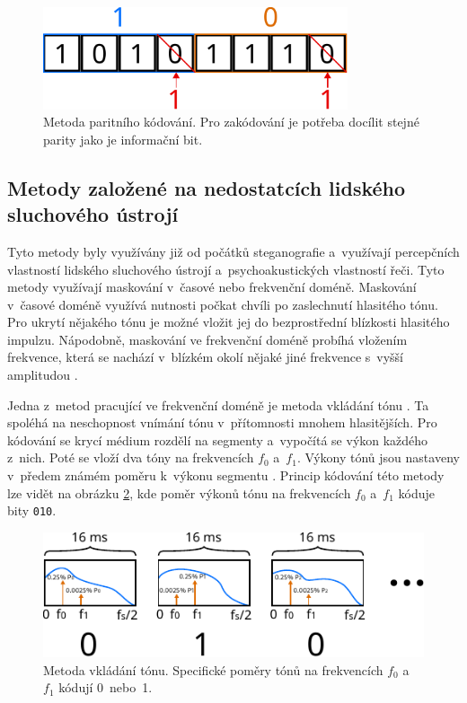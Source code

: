 \begin{figure}[hbt]
    \centering
    \includegraphics[width=0.8\textwidth]{obrazky/parity-coding.pdf}
    \caption{Metoda paritního kódování. Pro zakódování je potřeba docílit
    stejné parity jako je informační bit.}
    \label{pic:parity-coding}
\end{figure}

\subsection*{Metody založené na nedostatcích lidského sluchového ústrojí}
\label{sub:has}

Tyto metody byly využívány již od počátků steganografie a~využívají percepčních
vlastností lidského sluchového ústrojí a~psychoakustických vlastností řeči.
Tyto metody využívají maskování v~časové nebo frekvenční doméně. Maskování
v~časové doméně využívá nutnosti počkat chvíli po zaslechnutí hlasitého tónu.
Pro ukrytí nějakého tónu je možné vložit jej do bezprostřední blízkosti
hlasitého impulzu. Nápodobně, maskování ve frekvenční doméně probíhá vložením
frekvence, která se nachází v~blízkém okolí nějaké jiné frekvence s~vyšší
amplitudou \cite{Dutta2020}.

Jedna z~metod pracující ve frekvenční doméně je metoda vkládání tónu
\cite{Dutta2020}. Ta spoléhá na neschopnost vnímání tónu v~přítomnosti mnohem
hlasitějších. Pro kódování se krycí médium rozdělí na segmenty a~vypočítá se
výkon každého z~nich. Poté se vloží dva tóny na frekvencích $f_0$ a~$f_1$.
Výkony tónů jsou nastaveny v~předem známém poměru k~výkonu segmentu
\cite{Djebbar2012}. Princip kódování této metody lze vidět na obrázku
\ref{pic:tone-insertion}, kde poměr výkonů tónu na frekvencích $f_0$ a~$f_1$
kóduje bity \texttt{010}.

\begin{figure}[hbt]
    \centering
    \includegraphics[width=\textwidth]{obrazky/tone-insertion-diagram.pdf}
    \caption{Metoda vkládání tónu. Specifické poměry tónů na frekvencích $f_0$
    a~$f_1$ kódují 0~nebo~1.}
    \label{pic:tone-insertion}
\end{figure}

